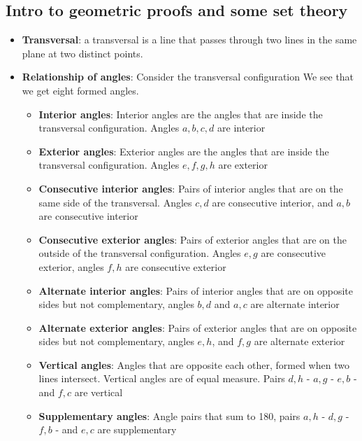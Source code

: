 \documentclass{report}
\begin{document}
    \subsection{Intro to geometric proofs and some set theory}
    \begin{itemize}
        \item \textbf{Transversal}: a transversal is a line that passes through two lines in the same plane at two distinct points.
        \item \textbf{Relationship of angles}: Consider the transversal configuration
            \bigbreak \noindent 
            \bigbreak \noindent 
            We see that we get eight formed angles.
            \begin{itemize}
                \item \textbf{Interior angles}: Interior angles are the angles that are inside the transversal configuration. Angles $a,b,c,d$ are interior
                \item \textbf{Exterior angles}: Exterior angles are the angles that are inside the transversal configuration. Angles $e,f,g,h$ are exterior
                \item \textbf{Consecutive interior angles}: Pairs of interior angles that are on the same side of the transversal. Angles $c,d$ are consecutive interior, and $a,b$ are consecutive interior
                \item \textbf{Consecutive exterior angles}: Pairs of exterior angles that are on the outside of the transversal configuration. Angles $e,g$ are consecutive exterior, angles $f,h$ are consecutive exterior
                \item \textbf{Alternate interior angles}: Pairs of interior angles that are on opposite sides but not complementary, angles $b,d$ and $a,c$ are alternate interior
                \item \textbf{Alternate exterior angles}: Pairs of exterior angles that are on opposite sides but not complementary, angles $e,h$, and $f,g$ are alternate exterior
                \item \textbf{Vertical angles}: Angles that are opposite each other, formed when two lines intersect. Vertical angles are of equal measure. Pairs $d,h$ - $a,g$ - $e,b$ - and $f,c$ are vertical
                \item \textbf{Supplementary angles}: Angle pairs that sum to 180, pairs $a,h$ - $d,g$ - $f,b$ - and $e,c$ are supplementary

\end{itemize}
\end{itemize}
\end{document}
